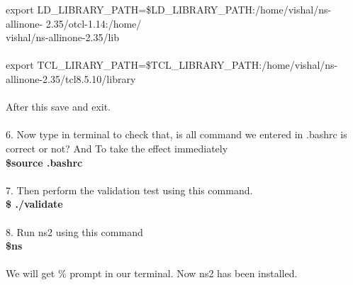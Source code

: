 export LD\_LIBRARY\_PATH=\$LD\_LIBRARY\_PATH:/home/vishal/ns-allinone- 2.35/otcl-1.14:/home/\\
vishal/ns-allinone-2.35/lib\\
\\
export TCL\_LIRARY\_PATH=\$TCL\_LIBRARY\_PATH:/home/vishal/ns-allinone-2.35/tcl8.5.10/library\\
\\
After this save and exit.\\
\\
6. Now type in terminal to check that, is all command we entered in .bashrc is correct or not? And To take the effect immediately\\
\textbf{\$source .bashrc}\\
\\
7. Then perform the validation test using this command.\\
\textbf{\$ ./validate}\\
\\
8. Run ns2 using this command\\
\textbf{\$ns}\\
\\
We will get \% prompt in our terminal. Now ns2 has been installed.\\

